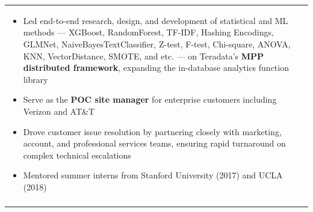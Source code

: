 \documentclass[letterpaper,11pt]{article} %
\begin{document}
\begin{tabular}{p{18.5cm}}
\begin{itemize}
\item Led end-to-end research, design, and development of statistical and ML methods — XGBoost, RandomForest, TF-IDF, Hashing Encodings, GLMNet, NaiveBayesTextClassifier, Z-test, F-test, Chi-square, ANOVA, KNN, VectorDistance, SMOTE, and etc. — on Teradata's \textbf{MPP distributed framework}, expanding the in-database analytics function library
\item Serve as the \textbf{POC site manager} for enterprise customers including Verizon and AT\&T 
\item Drove customer issue resolution by partnering closely with marketing, account, and professional services teams, ensuring rapid turnaround on complex technical escalations
\item Mentored summer interns from Stanford University (2017) and UCLA (2018)

\vspace*{-\baselineskip} 
\end{itemize} \\ 
\vspace{.1mm}

\end{tabular}


\end{document}
